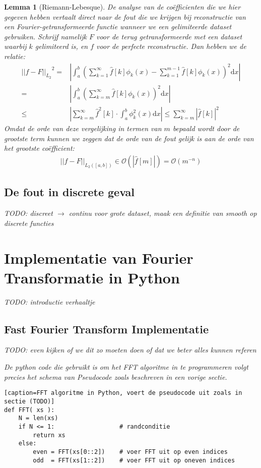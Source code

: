 \documentclass[11pt]{report}
\renewcommand{\O}{\mathcal{O}}
\newtheorem*{lemm}{Lemma}
\theoremstyle{remark}
\newcommand{\eq}[1]{\begin{eqnarray*} #1 \end{eqnarray*}}
\newcommand{\dx}{\text{d}x}
\newcommand{\Ldnorm}[1]{{||#1||_{L_2}}}
\newcommand{\abso}[1]{{\left| #1 \right|}}
\begin{document}
\begin{lemm}[Riemann-Lebesque]
De analyse van de co\"efficienten die we hier gegeven hebben vertaalt direct naar de fout die we krijgen
bij reconstructie van een Fourier-getransformeerde functie wanneer we een gelimiteerde dataset gebruiken.
Schrijf namelijk $F$ voor de terug getransformeerde met een dataset waarbij $k$ gelimiteerd is, en $f$ voor
de perfecte reconstructie. Dan hebben we de relatie:
\eq{
  \Ldnorm{ f - F }^2 =& 
  \abso{\int_a^b \left (\sum_{k=1}^\infty \hat f [k] \phi_k(x) 
    - \sum_{k=1}^{m-1} \hat f[k] \phi_k(x) \right)^2\dx } \\
  =& \abso{\int_a^b \left( \sum_{k=m}^\infty \hat f [k] \phi_k(x) \right)^2\dx } \\
  \leq& \abso{\sum_{k=m}^\infty \hat f^2 [k] \cdot \int_a^b \phi_k^2(x) \dx}
  \leq \sum_{k=m}^\infty \abso{\hat f[k]}^2
}
Omdat de orde van deze vergelijking in termen van $m$ bepaald wordt door de grootste term kunnen we zeggen 
dat de orde van de fout gelijk is aan de orde van het grootste co\"efficient:
\eq{
  ||f-F||_{L_2([a,b])} \in \O\left(\abso{\hat f[m]}\right) = \O(m^{-n})
}
\subsection{De fout in discrete geval}

TODO: discreet $\to$ continu voor grote dataset, maak een definitie van smooth op discrete functies

\section{Implementatie van Fourier Transformatie in Python}
TODO: introductie verhaaltje

\subsection{Fast Fourier Transform Implementatie}
TODO: even kijken of we dit zo moeten doen of dat we beter alles kunnen referen

De python code die gebruikt is om het FFT algoritme in te programmeren volgt precies het schema van Pseudocode
zoals beschreven in een vorige sectie.

\begin{lstlisting}[caption=FFT algoritme in Python, voert de pseudocode uit zoals in sectie (TODO)]
def FFT( xs ):
    N = len(xs)
    if N <= 1:                  # randconditie
        return xs
    else:
        even = FFT(xs[0::2])    # voer FFT uit op even indices
        odd  = FFT(xs[1::2])    # voer FFT uit op oneven indices


\end{lstlisting}
\end{lemm}
\end{document}
